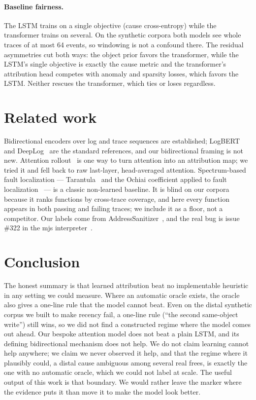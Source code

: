 \documentclass[11pt]{article}
\begin{document}
\paragraph{Baseline fairness.}
The LSTM trains on a single objective (cause cross-entropy) while the transformer trains on several. On the synthetic corpora both models see whole traces of at most 64 events, so windowing is not a confound there. The residual asymmetries cut both ways: the object prior favors the transformer, while the LSTM's single objective is exactly the cause metric and the transformer's attribution head competes with anomaly and sparsity losses, which favors the LSTM. Neither rescues the transformer, which ties or loses regardless.

\section{Related work}

Bidirectional encoders over log and trace sequences are established; LogBERT~\cite{logbert} and DeepLog~\cite{deeplog} are the standard references, and our bidirectional framing is not new. Attention rollout~\cite{abnar2020} is one way to turn attention into an attribution map; we tried it and fell back to raw last-layer, head-averaged attention. Spectrum-based fault localization --- Tarantula~\cite{tarantula} and the Ochiai coefficient applied to fault localization~\cite{ochiai} --- is a classic non-learned baseline. It is blind on our corpora because it ranks functions by cross-trace coverage, and here every function appears in both passing and failing traces; we include it as a floor, not a competitor. Our labels come from AddressSanitizer~\cite{asan}, and the real bug is issue \#322 in the mjs interpreter~\cite{mjs}.

\section{Conclusion}

The honest summary is that learned attribution beat no implementable heuristic in any setting we could measure. Where an automatic oracle exists, the oracle also gives a one-line rule that the model cannot beat. Even on the distal synthetic corpus we built to make recency fail, a one-line rule (``the second same-object write'') still wins, so we did not find a constructed regime where the model comes out ahead. Our bespoke attention model does not beat a plain LSTM, and its defining bidirectional mechanism does not help. We do not claim learning cannot help anywhere; we claim we never observed it help, and that the regime where it plausibly could, a distal cause ambiguous among several real frees, is exactly the one with no automatic oracle, which we could not label at scale. The useful output of this work is that boundary. We would rather leave the marker where the evidence puts it than move it to make the model look better.



\end{document}
